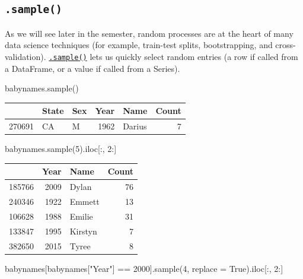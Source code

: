 \documentclass[
  letterpaper,
  DIV=11,
  numbers=noendperiod]{scrreprt}
\newenvironment{Shaded}{\begin{snugshade}}{\end{snugshade}}
\newcommand{\DecValTok}[1]{\textcolor[rgb]{0.68,0.00,0.00}{#1}}
\newcommand{\NormalTok}[1]{\textcolor[rgb]{0.00,0.23,0.31}{#1}}
\newcommand{\OperatorTok}[1]{\textcolor[rgb]{0.37,0.37,0.37}{#1}}
\newcommand{\StringTok}[1]{\textcolor[rgb]{0.13,0.47,0.30}{#1}}
\newcommand{\VariableTok}[1]{\textcolor[rgb]{0.07,0.07,0.07}{#1}}
\begin{document}
\hypertarget{sample}{%
\subsection{\texorpdfstring{\texttt{.sample()}}{.sample()}}\label{sample}}

As we will see later in the semester, random processes are at the heart
of many data science techniques (for example, train-test splits,
bootstrapping, and cross-validation).
\href{https://pandas.pydata.org/docs/reference/api/pandas.DataFrame.sample.html}{\texttt{.sample()}}
lets us quickly select random entries (a row if called from a DataFrame,
or a value if called from a Series).

\begin{Shaded}
\begin{Highlighting}[]
\NormalTok{babynames.sample()}
\end{Highlighting}
\end{Shaded}

\begin{tabular}{lllrlr}
\toprule
{} & State & Sex &  Year &    Name &  Count \\
\midrule
270691 &    CA &   M &  1962 &  Darius &      7 \\
\bottomrule
\end{tabular}

\begin{Shaded}
\begin{Highlighting}[]
\NormalTok{babynames.sample(}\DecValTok{5}\NormalTok{).iloc[:, }\DecValTok{2}\NormalTok{:]}
\end{Highlighting}
\end{Shaded}

\begin{tabular}{lrlr}
\toprule
{} &  Year &     Name &  Count \\
\midrule
185766 &  2009 &    Dylan &     76 \\
240346 &  1922 &   Emmett &     13 \\
106628 &  1988 &   Emilie &     31 \\
133847 &  1995 &  Kirstyn &      7 \\
382650 &  2015 &    Tyree &      8 \\
\bottomrule
\end{tabular}

\begin{Shaded}
\begin{Highlighting}[]
\NormalTok{babynames[babynames[}\StringTok{"Year"}\NormalTok{] }\OperatorTok{==} \DecValTok{2000}\NormalTok{].sample(}\DecValTok{4}\NormalTok{, replace }\OperatorTok{=} \VariableTok{True}\NormalTok{).iloc[:, }\DecValTok{2}\NormalTok{:]}
\end{Highlighting}
\end{Shaded}
\end{document}
